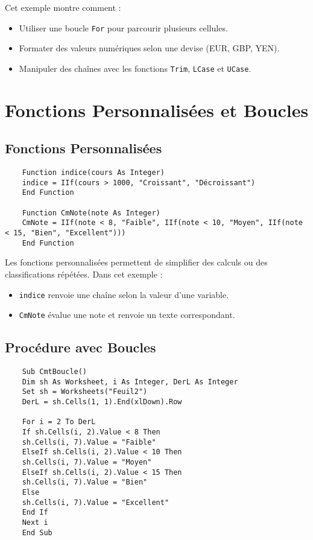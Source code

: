 \documentclass[a4paper,12pt]{report}
\begin{document}
Cet exemple montre comment :
\begin{itemize}
	\item Utiliser une boucle \texttt{For} pour parcourir plusieurs cellules.
	\item Formater des valeurs numériques selon une devise (EUR, GBP, YEN).
	\item Manipuler des chaînes avec les fonctions \texttt{Trim}, \texttt{LCase} et \texttt{UCase}.
\end{itemize}

\chapter{Fonctions Personnalisées et Boucles}

\section{Fonctions Personnalisées}
\begin{lstlisting}
	Function indice(cours As Integer)
	indice = IIf(cours > 1000, "Croissant", "Décroissant")
	End Function
	
	Function CmNote(note As Integer)
	CmNote = IIf(note < 8, "Faible", IIf(note < 10, "Moyen", IIf(note < 15, "Bien", "Excellent")))
	End Function
\end{lstlisting}

Les fonctions personnalisées permettent de simplifier des calculs ou des classifications répétées. Dans cet exemple :
\begin{itemize}
	\item \texttt{indice} renvoie une chaîne selon la valeur d'une variable.
	\item \texttt{CmNote} évalue une note et renvoie un texte correspondant.
	
\end{itemize}
\newpage
\section{Procédure avec Boucles}
\begin{lstlisting}
	Sub CmtBoucle()
	Dim sh As Worksheet, i As Integer, DerL As Integer
	Set sh = Worksheets("Feuil2")
	DerL = sh.Cells(1, 1).End(xlDown).Row
	
	For i = 2 To DerL
	If sh.Cells(i, 2).Value < 8 Then
	sh.Cells(i, 7).Value = "Faible"
	ElseIf sh.Cells(i, 2).Value < 10 Then
	sh.Cells(i, 7).Value = "Moyen"
	ElseIf sh.Cells(i, 2).Value < 15 Then
	sh.Cells(i, 7).Value = "Bien"
	Else
	sh.Cells(i, 7).Value = "Excellent"
	End If
	Next i
	End Sub
\end{lstlisting}
\end{document}
